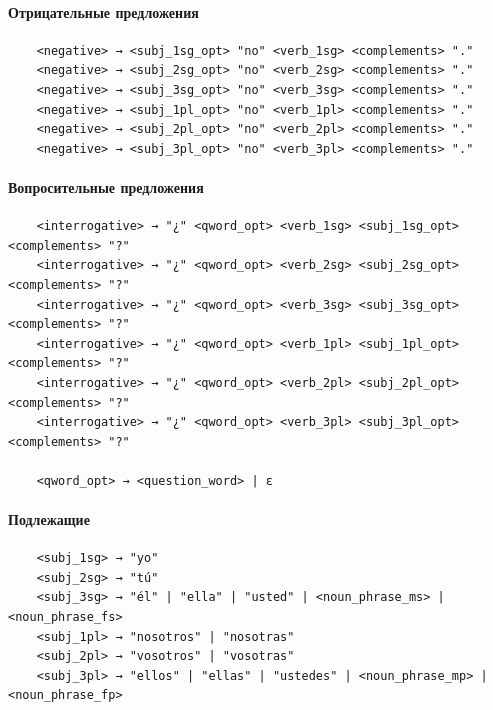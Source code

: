 \documentclass[a4paper,final]{article}
\begin{document}
\paragraph{Отрицательные предложения}\mbox{}\par
\begin{lstlisting}
    <negative> → <subj_1sg_opt> "no" <verb_1sg> <complements> "."
    <negative> → <subj_2sg_opt> "no" <verb_2sg> <complements> "."
    <negative> → <subj_3sg_opt> "no" <verb_3sg> <complements> "."
    <negative> → <subj_1pl_opt> "no" <verb_1pl> <complements> "."
    <negative> → <subj_2pl_opt> "no" <verb_2pl> <complements> "."
    <negative> → <subj_3pl_opt> "no" <verb_3pl> <complements> "."
\end{lstlisting}

\paragraph{Вопросительные предложения}\mbox{}\par
\begin{lstlisting}
    <interrogative> → "¿" <qword_opt> <verb_1sg> <subj_1sg_opt> <complements> "?"
    <interrogative> → "¿" <qword_opt> <verb_2sg> <subj_2sg_opt> <complements> "?"
    <interrogative> → "¿" <qword_opt> <verb_3sg> <subj_3sg_opt> <complements> "?"
    <interrogative> → "¿" <qword_opt> <verb_1pl> <subj_1pl_opt> <complements> "?"
    <interrogative> → "¿" <qword_opt> <verb_2pl> <subj_2pl_opt> <complements> "?"
    <interrogative> → "¿" <qword_opt> <verb_3pl> <subj_3pl_opt> <complements> "?"
    
    <qword_opt> → <question_word> | ε
\end{lstlisting}

\paragraph{Подлежащие}\mbox{}\par
\begin{lstlisting}
    <subj_1sg> → "yo"
    <subj_2sg> → "tú"
    <subj_3sg> → "él" | "ella" | "usted" | <noun_phrase_ms> | <noun_phrase_fs>
    <subj_1pl> → "nosotros" | "nosotras"
    <subj_2pl> → "vosotros" | "vosotras"
    <subj_3pl> → "ellos" | "ellas" | "ustedes" | <noun_phrase_mp> | <noun_phrase_fp>
\end{lstlisting}
\end{document}
